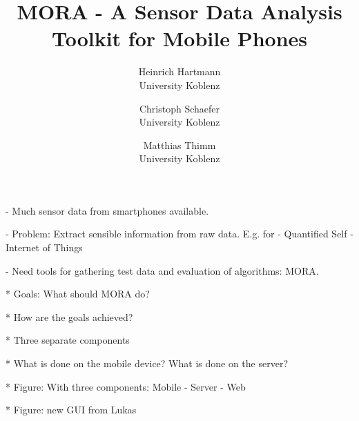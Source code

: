 \documentclass[times, 10pt,twocolumn]{article}
\begin{document}
\title{MORA - A Sensor Data Analysis Toolkit for Mobile Phones}

\author{Heinrich Hartmann\\
University Koblenz\\ %
\and
Christoph Schaefer \\
University Koblenz \\
\and
Matthias Thimm \\
University Koblenz \\
}

\maketitle
\thispagestyle{empty}

\begin{abstract}
\end{abstract}

- Much sensor data from smartphones available.

- Problem: Extract sensible information from raw data. E.g. for
  - Quantified Self
  - Internet of Things

- Need tools for gathering test data and evaluation of algorithms: MORA.


* Goals: What should MORA do?

* How are the goals achieved?

* Three separate components

* What is done on the mobile device? What is done on the server?

* Figure: With three components: Mobile - Server - Web

* Figure: new GUI from Lukas
\end{document}
